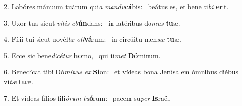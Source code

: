 2. Labóres mánuum tuárum qui\textit{a} \textit{man}\textit{du}\textbf{cá}bis: \ast\  beátus es, et bene ti\textit{bi} \textbf{e}rit.\

3. Uxor tua sicut \textit{vi}\textit{tis} \textit{ab}\textbf{ún}dans: \ast\  in latéribus do\textit{mus} \textbf{tu}æ.\

4. Fílii tui sicut novél\textit{læ} \textit{o}\textit{li}\textbf{vá}rum: \ast\  in circúitu men\textit{sæ} \textbf{tu}æ.\

5. Ecce sic bene\textit{di}\textit{cé}\textit{tur} \textbf{ho}mo, \ast\  qui ti\textit{met} \textbf{Dó}minum.\

6. Benedícat tibi Dó\textit{mi}\textit{nus} \textit{ex} \textbf{Si}on: \ast\  et vídeas bona Jerúsalem ómnibus diébus vi\textit{tæ} \textbf{tu}æ.\

7. Et vídeas fílios fili\textit{ó}\textit{rum} \textit{tu}\textbf{ó}rum: \ast\  pacem su\textit{per} \textbf{Is}raël.\

